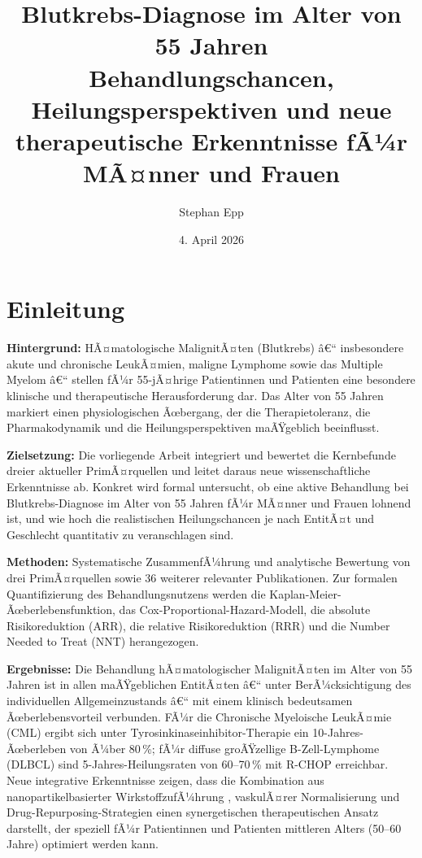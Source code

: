 ﻿\documentclass[12pt,a4paper]{article}
\title{\textbf{Blutkrebs-Diagnose im Alter von 55 Jahren}\\{\Large Behandlungschancen, Heilungsperspektiven und neue therapeutische Erkenntnisse fÃ¼r MÃ¤nner und Frauen}}
\date{4. April 2026}
\author{Stephan Epp}
\theoremstyle{definition}
\begin{document}
\maketitle
\tableofcontents
\newpage

\section{Einleitung}
\label{sec:einleitung}
\textbf{Hintergrund:} HÃ¤matologische MalignitÃ¤ten (Blutkrebs) â€“ insbesondere akute und
chronische LeukÃ¤mien, maligne Lymphome sowie das Multiple Myelom â€“ stellen fÃ¼r
55-jÃ¤hrige Patientinnen und Patienten eine besondere klinische und therapeutische
Herausforderung dar. Das Alter von 55 Jahren markiert einen physiologischen Ãœbergang,
der die Therapietoleranz, die Pharmakodynamik und die Heilungsperspektiven maÃŸgeblich
beeinflusst.

\noindent
\textbf{Zielsetzung:} Die vorliegende Arbeit integriert und bewertet die Kernbefunde
dreier aktueller PrimÃ¤rquellen \cite{adeyemi2025,wong2016,mccabe2015} und leitet daraus
neue wissenschaftliche Erkenntnisse ab. Konkret wird formal untersucht, ob eine aktive
Behandlung bei Blutkrebs-Diagnose im Alter von 55 Jahren fÃ¼r MÃ¤nner und Frauen lohnend
ist, und wie hoch die realistischen Heilungschancen je nach EntitÃ¤t und Geschlecht
quantitativ zu veranschlagen sind.

\noindent
\textbf{Methoden:} Systematische ZusammenfÃ¼hrung und analytische Bewertung von drei
PrimÃ¤rquellen sowie 36 weiterer relevanter Publikationen. Zur formalen Quantifizierung
des Behandlungsnutzens werden die Kaplan-Meier-Ãœberlebensfunktion, das
Cox-Proportional-Hazard-Modell, die absolute Risikoreduktion (ARR), die relative
Risikoreduktion (RRR) und die Number Needed to Treat (NNT) herangezogen.

\noindent
\textbf{Ergebnisse:} Die Behandlung hÃ¤matologischer MalignitÃ¤ten im Alter von 55 Jahren
ist in allen maÃŸgeblichen EntitÃ¤ten â€“ unter BerÃ¼cksichtigung des individuellen
Allgemeinzustands â€“ mit einem klinisch bedeutsamen Ãœberlebensvorteil verbunden. FÃ¼r
die Chronische Myeloische LeukÃ¤mie (CML) ergibt sich unter Tyrosinkinaseinhibitor-Therapie
ein 10-Jahres-Ãœberleben von Ã¼ber 80\,\%; fÃ¼r diffuse groÃŸzellige B-Zell-Lymphome (DLBCL)
sind 5-Jahres-Heilungsraten von 60--70\,\% mit R-CHOP erreichbar. Neue integrative
Erkenntnisse zeigen, dass die Kombination aus nanopartikelbasierter WirkstoffzufÃ¼hrung
\cite{adeyemi2025}, vaskulÃ¤rer Normalisierung \cite{wong2016} und Drug-Repurposing-Strategien
\cite{mccabe2015} einen synergetischen therapeutischen Ansatz darstellt, der speziell fÃ¼r
Patientinnen und Patienten mittleren Alters (50--60 Jahre) optimiert werden kann.
\end{document}
